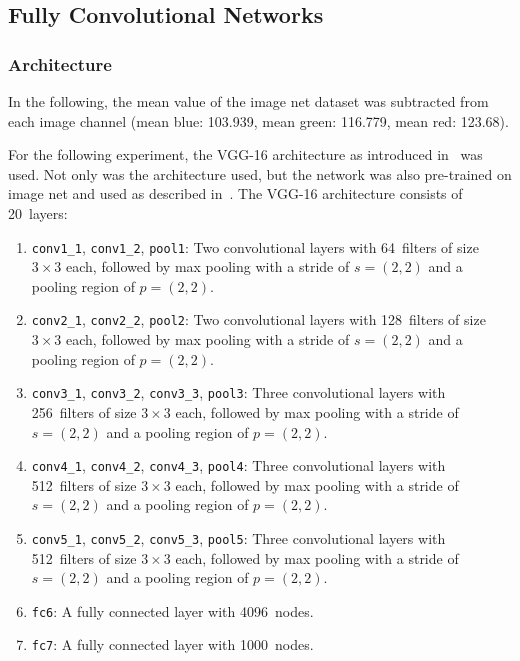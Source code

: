 
\subsection{Fully Convolutional Networks}\label{sec:ap5}

\subsubsection{Architecture}
In the following, the mean value of the image net dataset was subtracted from
each image channel (mean blue: 103.939, mean green: 116.779, mean red: 123.68).

For the following experiment, the VGG-16 architecture as introduced
in~\cite{simonyan2014very} was used. Not only was the architecture used, but
the network was also pre-trained on image net and used as described
in~\cite{Fossard2016}. The VGG-16 architecture consists of 20~layers:

\begin{enumerate}
    \item \verb+conv1_1+, \verb+conv1_2+, \verb+pool1+: Two convolutional
          layers with 64~filters of size $3 \times 3$ each, followed by max
          pooling with a stride of $s = (2, 2)$ and a pooling region of
          $p = (2, 2)$.
    \item \verb+conv2_1+, \verb+conv2_2+, \verb+pool2+: Two convolutional
          layers with 128~filters of size $3 \times 3$ each, followed by max
          pooling with a stride of $s = (2, 2)$ and a pooling region of
          $p = (2, 2)$.
    \item \verb+conv3_1+, \verb+conv3_2+, \verb+conv3_3+, \verb+pool3+: Three
          convolutional layers with 256~filters of size $3 \times 3$ each,
          followed by max pooling with a stride of $s = (2, 2)$ and a pooling
          region of $p = (2, 2)$.
    \item \verb+conv4_1+, \verb+conv4_2+, \verb+conv4_3+, \verb+pool4+: Three
          convolutional layers with 512~filters of size $3 \times 3$ each,
          followed by max pooling with a stride of $s = (2, 2)$ and a pooling
          region of $p = (2, 2)$.
    \item \verb+conv5_1+, \verb+conv5_2+, \verb+conv5_3+, \verb+pool5+: Three
          convolutional layers with 512~filters of size $3 \times 3$ each,
          followed by max pooling with a stride of $s = (2, 2)$ and a pooling
          region of $p = (2, 2)$.
    \item \verb+fc6+: A fully connected layer with 4096~nodes.
    \item \verb+fc7+: A fully connected layer with 1000~nodes.
\end{enumerate}

